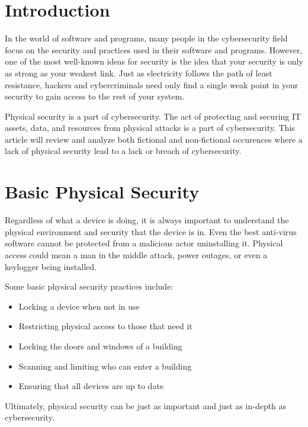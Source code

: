 \documentclass[acmsmall]{acmart}
\begin{document}
\maketitle

\section{Introduction}
In the world of software and programs, many people in the cybersecurity
field focus on the security and practices used in their software and programs.
However, one of the most well-known ideas for security is the idea that
your security is only as strong as your weakest link. Just as electricity
follows the path of least resistance, hackers and cybercriminals need only
find a single weak point in your security to gain access to the rest of
your system.

Physical security is a part of cybersecurity. The act of protecting and
securing IT assets, data, and resources from physical attacks is a part
of cybersecurity. This article will review and analyze both fictional and
non-fictional occurences where a lack of physical security lead to a lack
or breach of cybersecurity.

\section{Basic Physical Security}
Regardless of what a device is doing, it is always important to understand
the physical environment and security that the device is in. Even the
best anti-virus software cannot be protected from a malicious actor
uninstalling it. Physical access could mean a man in the middle attack,
power outages, or even a keylogger being installed.

Some basic physical security practices include:
\begin{itemize}
  \item Locking a device when not in use
  \item Restricting physical access to those that need it
  \item Locking the doors and windows of a building
  \item Scanning and limiting who can enter a building
  \item Ensuring that all devices are up to date
\end{itemize}

Ultimately, physical security can be just as important and just as in-depth
as cybersecurity.
\end{document}
